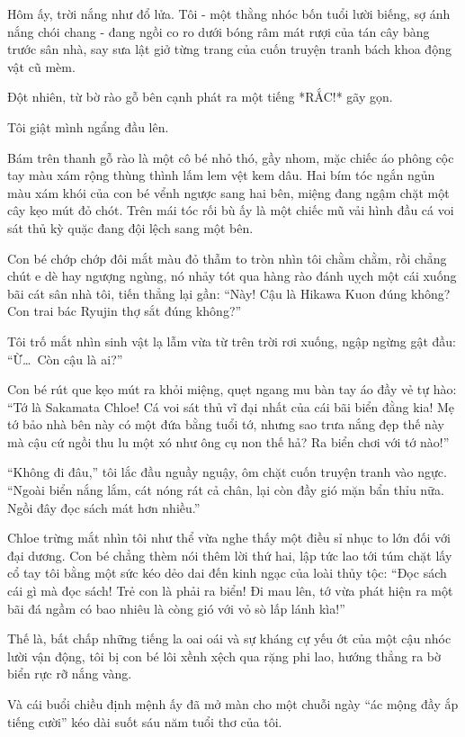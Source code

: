 \documentclass[../main.tex]{subfiles}
\begin{document}
Hôm ấy, trời nắng như đổ lửa. Tôi - một thằng nhóc bốn tuổi lười biếng, sợ ánh nắng chói chang - đang ngồi co ro dưới bóng râm mát rượi của tán cây bàng trước sân nhà, say sưa lật giở từng trang của cuốn truyện tranh bách khoa động vật cũ mèm.

Đột nhiên, từ bờ rào gỗ bên cạnh phát ra một tiếng *RẮC!* gãy gọn.

Tôi giật mình ngẩng đầu lên.

Bám trên thanh gỗ rào là một cô bé nhỏ thó, gầy nhom, mặc chiếc áo phông cộc tay màu xám rộng thùng thình lấm lem vệt kem dâu. Hai bím tóc ngắn ngủn màu xám khói của con bé vểnh ngược sang hai bên, miệng đang ngậm chặt một cây kẹo mút đỏ chót. Trên mái tóc rối bù ấy là một chiếc mũ vải hình đầu cá voi sát thủ kỳ quặc đang đội lệch sang một bên.

Con bé chớp chớp đôi mắt màu đỏ thẫm to tròn nhìn tôi chằm chằm, rồi chẳng chút e dè hay ngượng ngùng, nó nhảy tót qua hàng rào đánh uỵch một cái xuống bãi cát sân nhà tôi, tiến thẳng lại gần: ``Này! Cậu là Hikawa Kuon đúng không? Con trai bác Ryujin thợ sắt đúng không?''

Tôi trố mắt nhìn sinh vật lạ lẫm vừa từ trên trời rơi xuống, ngập ngừng gật đầu: ``Ừ\dots\ Còn cậu là ai?''

Con bé rút que kẹo mút ra khỏi miệng, quẹt ngang mu bàn tay áo đầy vẻ tự hào: ``Tớ là Sakamata Chloe! Cá voi sát thủ vĩ đại nhất của cái bãi biển đằng kia! Mẹ tớ bảo nhà bên này có một đứa bằng tuổi tớ, nhưng sao trưa nắng đẹp thế này mà cậu cứ ngồi thu lu một xó như ông cụ non thế hả? Ra biển chơi với tớ nào!''

``Không đi đâu,'' tôi lắc đầu nguầy nguậy, ôm chặt cuốn truyện tranh vào ngực. ``Ngoài biển nắng lắm, cát nóng rát cả chân, lại còn đầy gió mặn bẩn thỉu nữa. Ngồi đây đọc sách mát hơn nhiều.''

Chloe trừng mắt nhìn tôi như thể vừa nghe thấy một điều sỉ nhục to lớn đối với đại dương. Con bé chẳng thèm nói thêm lời thứ hai, lập tức lao tới túm chặt lấy cổ tay tôi bằng một sức kéo dẻo dai đến kinh ngạc của loài thủy tộc: ``Đọc sách cái gì mà đọc sách! Trẻ con là phải ra biển! Đi mau lên, tớ vừa phát hiện ra một bãi đá ngầm có bao nhiêu là còng gió với vỏ sò lấp lánh kìa!''

Thế là, bất chấp những tiếng la oai oái và sự kháng cự yếu ớt của một cậu nhóc lười vận động, tôi bị con bé lôi xềnh xệch qua rặng phi lao, hướng thẳng ra bờ biển rực rỡ nắng vàng.

Và cái buổi chiều định mệnh ấy đã mở màn cho một chuỗi ngày ``ác mộng đầy ắp tiếng cười'' kéo dài suốt sáu năm tuổi thơ của tôi.
\end{document}
